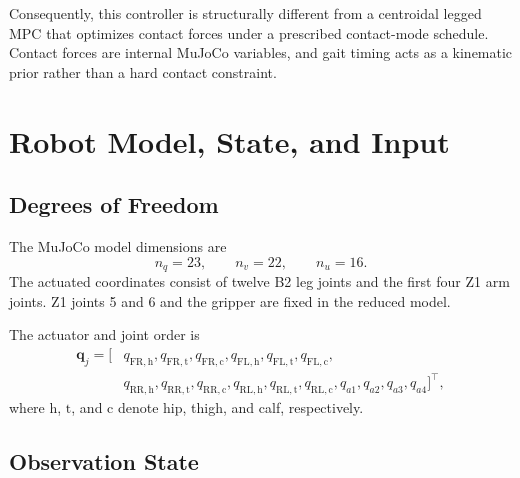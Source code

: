 \documentclass[11pt,a4paper]{article}
\begin{document}
Consequently, this controller is structurally different from a centroidal
legged MPC that optimizes contact forces under a prescribed contact-mode
schedule. Contact forces are internal MuJoCo variables, and gait timing acts as
a kinematic prior rather than a hard contact constraint.

\section{Robot Model, State, and Input}

\subsection{Degrees of Freedom}

The MuJoCo model dimensions are
\begin{equation}
  n_q=23,\qquad n_v=22,\qquad n_u=16.
\end{equation}
The actuated coordinates consist of twelve B2 leg joints and the first four Z1
arm joints. Z1 joints 5 and 6 and the gripper are fixed in the reduced model.

The actuator and joint order is
\begin{align*}
\bm{q}_j = [&q_{\mathrm{FR,h}},q_{\mathrm{FR,t}},q_{\mathrm{FR,c}},
q_{\mathrm{FL,h}},q_{\mathrm{FL,t}},q_{\mathrm{FL,c}},\\
&q_{\mathrm{RR,h}},q_{\mathrm{RR,t}},q_{\mathrm{RR,c}},
q_{\mathrm{RL,h}},q_{\mathrm{RL,t}},q_{\mathrm{RL,c}},
q_{a1},q_{a2},q_{a3},q_{a4}]^\top ,
\end{align*}
where $\mathrm{h}$, $\mathrm{t}$, and $\mathrm{c}$ denote hip, thigh, and calf,
respectively.

\subsection{Observation State}
\end{document}
